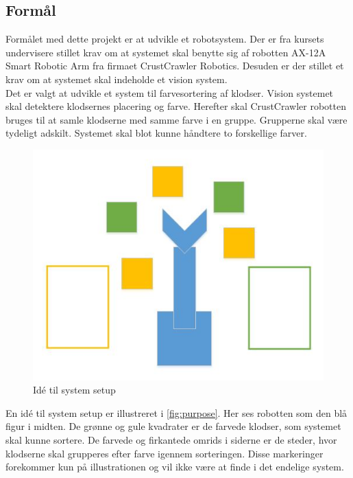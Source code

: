 \subsection{Formål}

Formålet med dette projekt er at udvikle et robotsystem.
Der er fra kursets undervisere stillet krav om at systemet skal benytte sig af robotten AX-12A Smart Robotic Arm fra firmaet CrustCrawler Robotics.
Desuden er der stillet et krav om at systemet skal indeholde et vision system. \\

Det er valgt at udvikle et system til farvesortering af klodser.
Vision systemet skal detektere klodsernes placering og farve.
Herefter skal CrustCrawler robotten bruges til at samle klodserne med samme farve i en gruppe.
Grupperne skal være tydeligt adskilt.
Systemet skal blot kunne håndtere to forskellige farver. \\


\begin{figure}[h]
\centering
\includegraphics[scale=0.65]{images/purpose}
\caption{Idé til system setup}
\label{fig:purpose}
\end{figure}

En idé til system setup er illustreret i \autoref{fig:purpose}.
Her ses robotten som den blå figur i midten. De grønne og gule kvadrater er de farvede klodser, som systemet skal kunne sortere. 
De farvede og firkantede omrids i siderne er de steder, hvor klodserne skal grupperes efter farve igennem sorteringen.
Disse markeringer forekommer kun på illustrationen og vil ikke være at finde i det endelige system. \\